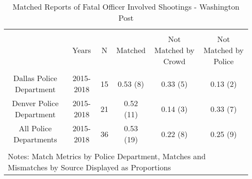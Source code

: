 
\begin{table}[!htbp] \centering 
  \caption{Matched Reports of Fatal Officer Involved Shootings - Washington Post} 
  \label{} 
\footnotesize 
\begin{tabular}{@{\extracolsep{5pt}} cccccc} 
\\[-1.8ex]\hline 
\hline \\[-1.8ex] 
 & Years & N & Matched & Not Matched by Crowd & Not Matched by Police \\ 
\hline \\[-1.8ex] 
Dallas Police Department & 2015-2018 & 15 & 0.53 (8) & 0.33 (5) & 0.13 (2) \\ 
Denver Police Department & 2015-2018 & 21 & 0.52 (11) & 0.14 (3) & 0.33 (7) \\ 
All Police Departments   & 2015-2018 & 36 & 0.53 (19) & 0.22 (8) & 0.25 (9) \\ 
\hline \\[-1.8ex] 
\multicolumn{6}{l}{Notes: Match Metrics by Police Department, Matches and Mismatches by Source Displayed as Proportions} \\ 
\end{tabular} 
\end{table}  
